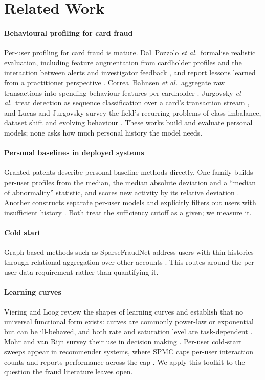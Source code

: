 \section{Related Work}\label{sec:related}

\paragraph{Behavioural profiling for card fraud}
Per-user profiling for card fraud is mature. Dal~Pozzolo \emph{et al.}\ formalise realistic evaluation, including feature augmentation from cardholder profiles and the interaction between alerts and investigator feedback \cite{dalpozzolo2018realistic}, and report lessons learned from a practitioner perspective \cite{dalpozzolo2014learned}. Correa~Bahnsen \emph{et al.}\ aggregate raw transactions into spending-behaviour features per cardholder \cite{bahnsen2016feature}. Jurgovsky \emph{et al.}\ treat detection as sequence classification over a card's transaction stream \cite{jurgovsky2018sequence}, and Lucas and Jurgovsky survey the field's recurring problems of class imbalance, dataset shift and evolving behaviour \cite{lucas2020survey}. These works build and evaluate personal models; none asks how much personal history the model needs.

\paragraph{Personal baselines in deployed systems}
Granted patents describe personal-baseline methods directly. One family builds per-user profiles from the median, the median absolute deviation and a ``median of abnormality'' statistic, and scores new activity by its relative deviation \cite{saunders2021profile,saunders2023profile}. Another constructs separate per-user models and explicitly filters out users with insufficient history \cite{faigon2021anomaly}. Both treat the sufficiency cutoff as a given; we measure it.

\paragraph{Cold start}
Graph-based methods such as SparseFraudNet address users with thin histories through relational aggregation over other accounts \cite{zhang2025sparsefraudnet}. This routes around the per-user data requirement rather than quantifying it.

\paragraph{Learning curves}
Viering and Loog review the shapes of learning curves and establish that no universal functional form exists: curves are commonly power-law or exponential but can be ill-behaved, and both rate and saturation level are task-dependent \cite{viering2023shape}. Mohr and van Rijn survey their use in decision making \cite{mohr2022learning}. Per-user cold-start sweeps appear in recommender systems, where SPMC caps per-user interaction counts and reports performance across the cap \cite{cai2017spmc}. We apply this toolkit to the question the fraud literature leaves open.

